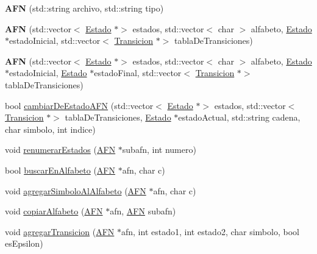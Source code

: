 \begin{DoxyCompactItemize}
\item 
\mbox{\label{class_a_f_n_a1a1a5a306993dc75210534dc44d68b6e}} 
{\bfseries A\+FN} (std\+::string archivo, std\+::string tipo)
\item 
\mbox{\label{class_a_f_n_a91830f0864d932083dd22fdd37130ccf}} 
{\bfseries A\+FN} (std\+::vector$<$ \hyperlink{class_estado}{Estado} $\ast$$>$ estados, std\+::vector$<$ char $>$ alfabeto, \hyperlink{class_estado}{Estado} $\ast$estado\+Inicial, std\+::vector$<$ \hyperlink{class_transicion}{Transicion} $\ast$$>$ tabla\+De\+Transiciones)
\item 
\mbox{\label{class_a_f_n_a6182f3845980b55ce144e89a3e5f0d1d}} 
{\bfseries A\+FN} (std\+::vector$<$ \hyperlink{class_estado}{Estado} $\ast$$>$ estados, std\+::vector$<$ char $>$ alfabeto, \hyperlink{class_estado}{Estado} $\ast$estado\+Inicial, \hyperlink{class_estado}{Estado} $\ast$estado\+Final, std\+::vector$<$ \hyperlink{class_transicion}{Transicion} $\ast$$>$ tabla\+De\+Transiciones)
\item 
bool \hyperlink{class_a_f_n_afb6a2f99f54906074bd00e49538ea1f7}{cambiar\+De\+Estado\+A\+FN} (std\+::vector$<$ \hyperlink{class_estado}{Estado} $\ast$$>$ estados, std\+::vector$<$ \hyperlink{class_transicion}{Transicion} $\ast$$>$ tabla\+De\+Transiciones, \hyperlink{class_estado}{Estado} $\ast$estado\+Actual, std\+::string cadena, char simbolo, int indice)
\item 
void \hyperlink{class_a_f_n_a3722c00ec07a1df9887336a48ce33050}{renumerar\+Estados} (\hyperlink{class_a_f_n}{A\+FN} $\ast$subafn, int numero)
\item 
bool \hyperlink{class_a_f_n_a8435129e1a74e46b2727ddc087b7b3eb}{buscar\+En\+Alfabeto} (\hyperlink{class_a_f_n}{A\+FN} $\ast$afn, char c)
\item 
void \hyperlink{class_a_f_n_ac4e76a6828f9e227ed460d2e75a3a965}{agregar\+Simbolo\+Al\+Alfabeto} (\hyperlink{class_a_f_n}{A\+FN} $\ast$afn, char c)
\item 
void \hyperlink{class_a_f_n_a1c17f6a2dd580162303127bfbdac2d4b}{copiar\+Alfabeto} (\hyperlink{class_a_f_n}{A\+FN} $\ast$afn, \hyperlink{class_a_f_n}{A\+FN} subafn)
\item 
void \hyperlink{class_a_f_n_aaf3c4c74bdc3bc0bc31c1513773fbce2}{agregar\+Transicion} (\hyperlink{class_a_f_n}{A\+FN} $\ast$afn, int estado1, int estado2, char simbolo, bool es\+Epsilon)

\end{DoxyCompactItemize}
